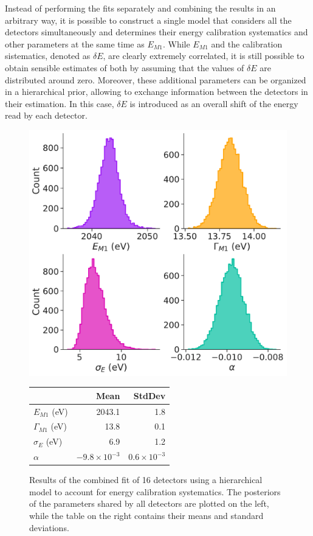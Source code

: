 Instead of performing the fits separately and combining the results in an arbitrary way, it is possible to construct a single model that considers all the detectors
simultaneously and determines their energy calibration systematics and other parameters at the same time as $E _{M 1}$.
While $E_{M 1}$ and the calibration sistematics, denoted as $\delta E$, are clearly extremely correlated, it is still
possible to obtain sensible estimates of both by assuming that the values of $\delta E$ are distributed around zero.
Moreover, these additional parameters can be organized in a hierarchical prior, allowing to exchange information between
the detectors in their estimation. In this case, $\delta E$ is introduced as an overall shift of the energy read by
each detector.

\begin{figure}[t]
  \begin{minipage}{0.55\linewidth}
    \includegraphics[width=\linewidth]{figures/ch3/peaks/dis_plot_0.pdf}
  \end{minipage}
  \hspace{0.3cm}
  \begin{minipage}{0.4\linewidth}
\begin{tabular}{lrr}
\toprule
 & Mean & StdDev \\
\midrule
  $E_{M 1}$ (eV)& 2043.1 & 1.8 \\
$\Gamma_{M 1}$ (eV)& 13.8 & 0.1 \\
$\sigma_E$ (eV)& 6.9 & 1.2 \\
$\alpha$ & $-9.8\times 10^{-3}$ & $0.6\times 10^{-3}$ \\
\bottomrule
\end{tabular}
  \end{minipage}
\caption{Results of the combined fit of 16 detectors using a hierarchical model to account for energy calibration
systematics. The posteriors of the parameters shared by all detectors are plotted on the left, while the table on the
right contains their means and standard deviations.}
\label{fig:preliminaryres}
\end{figure}
